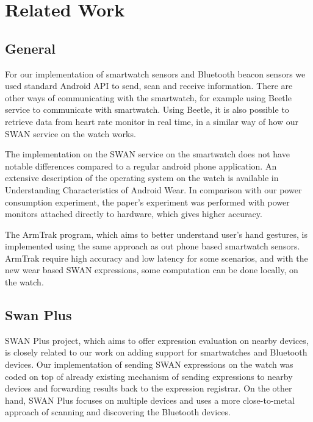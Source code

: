 
\chapter{Related Work} %

\label{Chapter2} %



\section{General}
For our implementation of smartwatch sensors and Bluetooth beacon sensors we used standard Android API to send, scan and receive information.
There are other ways of communicating with the smartwatch, for example using Beetle\cite{beetle_mobisys16} service to communicate with smartwatch.
Using Beetle, it is also possible to retrieve data from heart rate monitor in real time, in a similar way of how our SWAN service on the watch works.

The implementation on the SWAN service on the smartwatch does not have notable differences compared to a regular android phone application.
An extensive description of the operating system on the watch is available  in Understanding Characteristics of Android Wear\cite{android_wear_char}.
In comparison with our power consumption experiment, the paper's experiment was performed  with power monitors attached 
directly to hardware, which gives higher accuracy.

The ArmTrak\cite{arm_trak} program, which aims to better understand user's hand gestures, is implemented using the same approach as out phone based 
smartwatch sensors. ArmTrak require high accuracy and low latency for some scenarios, and with the new wear based SWAN expressions, some computation can be
done locally, on the watch.

\section{Swan Plus}
SWAN Plus\cite{swan_plus} project, which aims to offer expression evaluation on nearby devices, is closely related to our work on adding support for smartwatches and Bluetooth devices.
Our implementation of sending SWAN expressions on the watch was coded on top of already existing mechanism of sending expressions to nearby devices and forwarding results back to the expression
registrar. On the other hand, SWAN Plus focuses on multiple devices and uses a more close-to-metal approach of scanning and discovering the Bluetooth devices.

